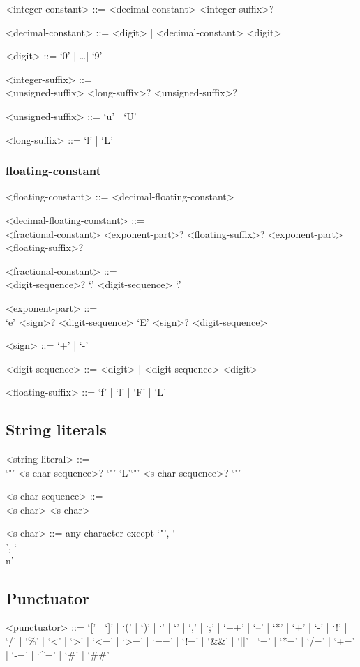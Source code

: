 \documentclass[a4paper]{article}
\begin{document}
\begin{grammar}
	<integer-constant> ::= <decimal-constant> <integer-suffix>?

	<decimal-constant> ::= <digit> | <decimal-constant> <digit>

	<digit> ::= `0' | \dots | `9'

	<integer-suffix> ::= \hfill \\
		<unsigned-suffix> <long-suffix>?
		\alt <long-suffix> <unsigned-suffix>?
	
	<unsigned-suffix> ::= `u' | `U'

	<long-suffix> ::= `l' | `L'
	
\end{grammar}

\subsubsection{floating-constant}

\begin{grammar}
	<floating-constant> ::= <decimal-floating-constant>

	<decimal-floating-constant> ::= \hfill \\
		<fractional-constant> <exponent-part>? <floating-suffix>?
		\alt <digit-sequence> <exponent-part> <floating-suffix>?

	<fractional-constant> ::= \hfill \\ 
		<digit-sequence>? `.' <digit-sequence> 
		\alt <digit-sequence> `.'

	<exponent-part> ::= \hfill \\
		`e' <sign>? <digit-sequence>
		\alt `E' <sign>? <digit-sequence>
	
	<sign> ::= `+' | `-'

	<digit-sequence> ::= <digit> | <digit-sequence> <digit>

	<floating-suffix> ::= `f' | `l' | `F' | `L'
\end{grammar}

\subsection{String literals}

\begin{grammar}
	<string-literal> ::= \hfill \\
		`"' <s-char-sequence>? `"'
			\alt `L'`"' <s-char-sequence>? `"'
	
	<s-char-sequence> ::= \hfill \\ 
		<s-char>
		\alt <s-char-sequence> <s-char>
	
	<s-char> ::= any character except `"', `\\', `\\n'
		\alt <escape-sequence>
\end{grammar}

\subsection{Punctuator}

\begin{grammar}
	<punctuator> ::= `[' | `]' | `(' | `)' | `{' | `}' | `,' | `;' |
		`++' | `--' | `*' | `+' | `-' | `!' | `/' | `\%' | `<' | `>' |
		`<=' | `>=' | `==' | `!=' | `&&' | `||' |
		`=' | `*=' | `/=' | `+=' | `-=' | `^=' |
		`#' | `##'
	
\end{grammar}
	
\end{document}
